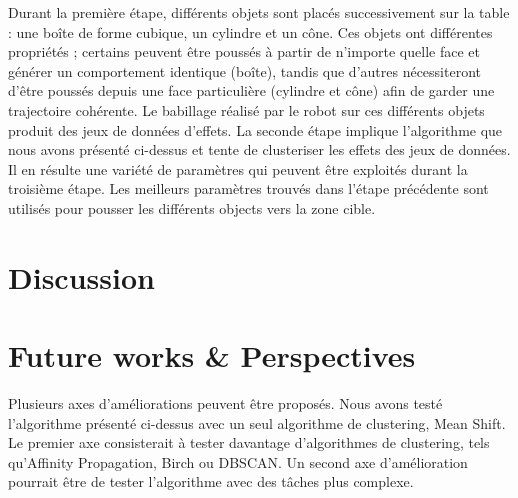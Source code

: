 \documentclass{llncs}
\begin{document}
Durant la première étape, différents objets sont placés successivement sur la table : une boîte de forme cubique, un cylindre et un cône. Ces objets ont différentes propriétés ; certains peuvent être poussés à partir de n'importe quelle face et générer un comportement identique (boîte), tandis que d'autres nécessiteront d'être poussés depuis une face particulière (cylindre et cône) afin de garder une trajectoire cohérente. Le babillage réalisé par le robot sur ces différents objets produit des jeux de données d'effets.
La seconde étape implique l'algorithme que nous avons présenté ci-dessus et tente de clusteriser les effets des jeux de données. Il en résulte une variété de paramètres qui peuvent être exploités durant la troisième étape.
Les meilleurs paramètres trouvés dans l'étape précédente sont utilisés pour pousser les différents objects vers la zone cible.



\section{Discussion}

\section{Future works \& Perspectives}

Plusieurs axes d'améliorations peuvent être proposés. Nous avons testé l'algorithme présenté ci-dessus avec un seul algorithme de clustering, Mean Shift. Le premier axe consisterait à tester davantage d'algorithmes de clustering, tels qu'Affinity Propagation, Birch ou DBSCAN. Un second axe d'amélioration pourrait être de tester l'algorithme avec des tâches plus complexe.
\end{document}
